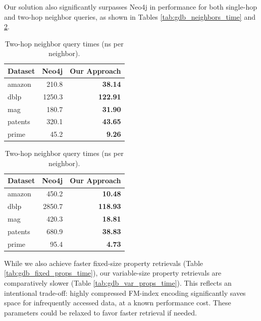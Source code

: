 Our solution also significantly surpasses Neo4j in performance for both single-hop and two-hop neighbor queries, as shown in Tables \ref{tab:gdb_neighbors_time} and \ref{tab:gdb_neighbors2_time}.

\begin{table}[htbp]
  \centering
  \begin{minipage}{0.48\textwidth}
\centering
\caption{Single-hop neighbor query times (ns per neighbor).}
\label{tab:gdb_neighbors_time}
\begin{tabular}{lrr}
\toprule
Dataset & Neo4j & Our Approach \\
\midrule
amazon   & 210.8   & \textbf{38.14}  \\
dblp     & 1250.3  & \textbf{122.91} \\
mag      & 180.7   & \textbf{31.90}  \\
patents  & 320.1   & \textbf{43.65}  \\
prime    & 45.2    & \textbf{9.26}   \\
\bottomrule
\end{tabular}
\end{minipage}
  \hfill
\begin{minipage}{0.48\textwidth}
\centering
\caption{Two-hop neighbor query times (ns per neighbor).}
\label{tab:gdb_neighbors2_time}
\begin{tabular}{lrr}
\toprule
Dataset & Neo4j & Our Approach \\
\midrule
amazon   & 450.2   & \textbf{10.48}  \\
dblp     & 2850.7  & \textbf{118.93} \\
mag      & 420.3   & \textbf{18.81}  \\
patents  & 680.9   & \textbf{38.83}  \\
prime    & 95.4    & \textbf{4.73}   \\
\bottomrule
\end{tabular}
\end{minipage}
\end{table}
\FloatBarrier

While we also achieve faster fixed-size property retrievals (Table \ref{tab:gdb_fixed_props_time}), our variable-size property retrievals are comparatively slower (Table \ref{tab:gdb_var_props_time}). This reflects an intentional trade-off: highly compressed FM-index encoding significantly saves space for infrequently accessed data, at a known performance cost. These parameters could be relaxed to favor faster retrieval if needed.

